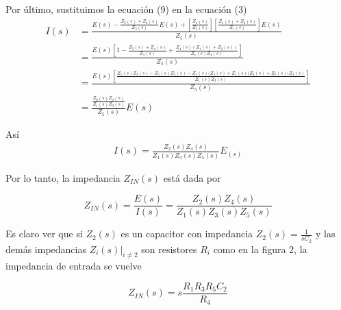 \documentclass[12pt]{article}
\begin{document}
	\noindent Por último, sustituimos la ecuación (9) en la ecuación (3)	
	\begin{align}
		I(s) &= \frac{ E(s) - \frac{Z_3(s) + Z_4(s)}{Z_3(s)}E(s) + \left[ \frac{Z_4(s)}{Z_3(s)} \right] \left[ \frac{Z_1(s) + Z_2(s)}{Z_1(s)} \right]E(s)  }{Z_5(s)}\nonumber\\
		&= \frac{ E(s)\left[ 1 - \frac{Z_3(s) + Z_4(s)}{Z_3(s)} + \frac{Z_4(s) \left( Z_1(s) + Z_2(s)\right)}{Z_1(s)Z_3(s)} \right] }{Z_5(s)}\nonumber\\
		&= \frac{E(s) \left[ \frac{ Z_1(s)Z_3(s) - Z_1(s)Z_3(s) -Z_1(s)(Z_4(s) + Z_1(s)(Z_4(s) + Z_2(s)(Z_4(s)}{Z_1(s)Z_3(s)} \right] }{Z_5(s)}\nonumber\\
		&=\frac{ \frac{Z_2(s)Z_4(s)}{Z_1(s)Z_3(s)} }{Z_5(s)}E(s)\nonumber
	\end{align}
	
	\noindent Así
	\begin{align}
		I(s) = \frac{Z_2(s)Z_4(s)}{Z_1(s)Z_3(s)Z_5(s)}E_(s)
	\end{align}
	
	\noindent Por lo tanto, la impedancia $Z_{IN}(s)$ está dada por
	\begin{tcolorbox}[colback=red!5!white,colframe=red!75!black,arc=0mm,boxrule=0mm,width=(\linewidth+0.5cm)]
		\begin{equation}
			Z_{IN}(s) = \frac{E(s)}{I(s)} = \frac{Z_2(s)Z_4(s)}{Z_1(s)Z_3(s)Z_5(s)}
		\end{equation}
	\end{tcolorbox}
	
	Es claro ver que si $Z_2(s)$ es un capacitor con impedancia $Z_2(s) = \frac{1}{sC_2}$ y las demás impedancias $Z_i(s)|_{i \neq 2}$ son resistores $R_i$ como en la figura 2, la impedancia de entrada se vuelve
	
	\begin{tcolorbox}[colback=red!5!white,colframe=red!75!black,arc=0mm,boxrule=0mm,width=(\linewidth+0.5cm)]
		\begin{equation}
			Z_{IN}(s) = s\frac{R_1R_3R_5C_2}{R_4}
		\end{equation}
	\end{tcolorbox}
	
\end{document}
